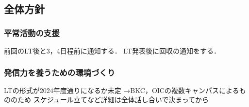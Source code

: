 \subsection*{全体方針}


\subsubsection*{平常活動の支援}
 前回のLT後と3，4日程前に通知する．
 LT発表後に回収の通知をする．

\subsubsection*{発信力を養うための環境づくり}
 LTの形式が2024年度通りになるか未定
  →BKC，OICの複数キャンパスによるもののため
 スケジュール立てなど詳細は全体話し合いで決まってから
